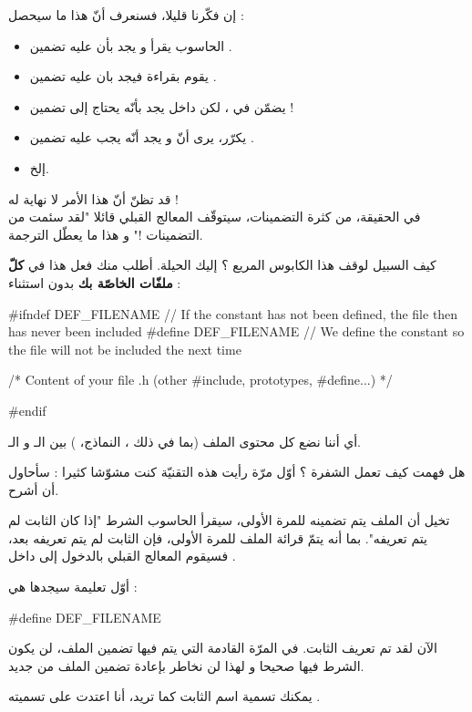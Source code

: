 إن فكّرنا قليلا، فسنعرف أنّ هذا ما سيحصل :
\begin{itemize}
  \item  الحاسوب يقرأ
و يجد بأن عليه تضمين
.
  \item يقوم بقراءة
فيجد بان عليه تضمين
.
  \item  يضمّن
في
،
لكن داخل
يجد بأنّه يحتاج إلى تضمين
 !
  \item يكرّر، يرى أنّ
و يجد أنّه يجب عليه تضمين
.
  \item إلخ.
\end{itemize}
قد تظنّ أنّ هذا الأمر لا نهاية له !\\
في الحقيقة، من كثرة التضمينات، سيتوقّف المعالج القبلي قائلا "لقد سئمت من التضمينات !" و هذا ما يعطّل الترجمة.

كيف السبيل لوقف هذا الكابوس المريع ؟ إليك الحيلة. أطلب منك فعل هذا في
\textbf{كلّ ملفّات
الخاصّة بك} بدون استثناء :
\begin{Csource}
#ifndef DEF_FILENAME // If the constant has not been defined, the file then has never been included
#define DEF_FILENAME // We define the constant so the file will not be included the next time

/* Content of your file .h (other #include, prototypes, #define...) */

#endif
\end{Csource}
أي أننا نضع كل محتوى الملف
(بما في ذلك
،
النماذج،
)
بين الـ
و الـ.

هل فهمت كيف تعمل الشفرة ؟ أوّل مرّة رأيت هذه التقنيّة كنت مشوّشا كثيرا : سأحاول أن أشرح.

تخيل أن الملف
يتم تضمينه للمرة الأولى، سيقرأ الحاسوب الشرط "إذا كان الثابت
لم يتم تعريفه". بما أنه يتمّ قرائة الملف للمرة الأولى، فإن الثابت لم يتم تعريفه بعد، فسيقوم المعالج القبلي بالدخول إلى داخل
.

أوّل تعليمة سيجدها هي :
\begin{Csource}
#define DEF_FILENAME
\end{Csource}
الآن لقد تم تعريف الثابت. في المرّة القادمة التي يتم فيها تضمين الملف، لن يكون الشرط فيها صحيحا و لهذا لن نخاطر بإعادة تضمين الملف من جديد.

يمكنك تسمية اسم الثابت كما تريد، أنا اعتدت على تسميته
.

